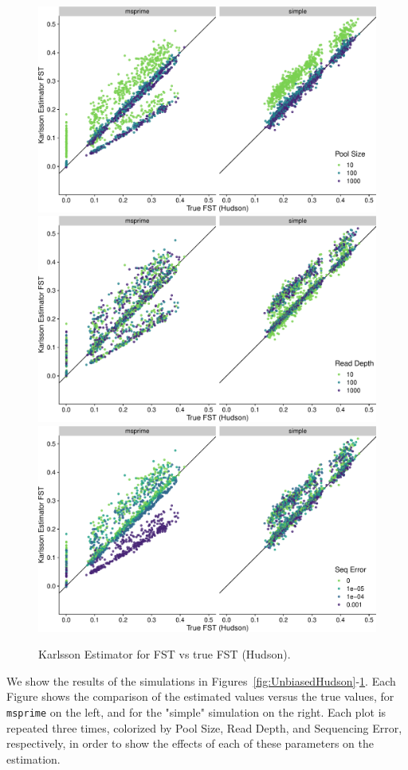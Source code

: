 \documentclass[letterpaper,fontsize=9pt,DIV=12]{scrartcl}
\begin{document}
\begin{figure}[p]
    \centering
    \includegraphics[width=.69\linewidth]{true_hudson_fst-est_karlsson-pool_size.pdf}
    \includegraphics[width=.69\linewidth]{true_hudson_fst-est_karlsson-read_depth.pdf}
    \includegraphics[width=.69\linewidth]{true_hudson_fst-est_karlsson-seq_error.pdf}
    \vspace*{-1em}
    \caption{
        Karlsson Estimator for FST vs true FST (Hudson).
    }
\label{fig:Karlsson}
\end{figure}

We show the results of the simulations in Figures~\ref{fig:UnbiasedHudson}-\ref{fig:Karlsson}. Each Figure shows the comparison of the estimated values versus the true values, for \texttt{msprime} on the left, and for the "simple" simulation on the right. Each plot is repeated three times, colorized by Pool Size, Read Depth, and Sequencing Error, respectively, in order to show the effects of each of these parameters on the estimation.
\end{document}
